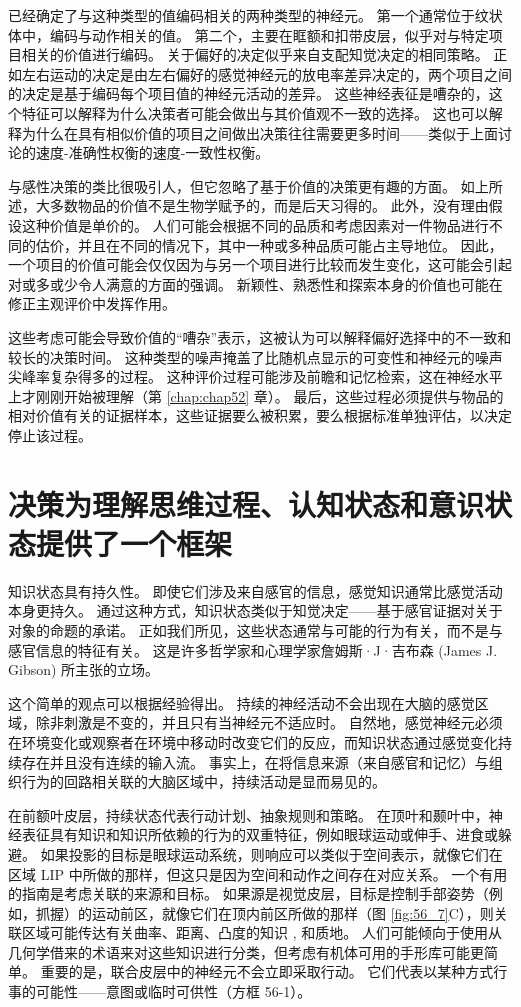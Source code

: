 已经确定了与这种类型的值编码相关的两种类型的神经元。 第一个通常位于纹状体中，编码与动作相关的值。 第二个，主要在眶额和扣带皮层，似乎对与特定项目相关的价值进行编码。 关于偏好的决定似乎来自支配知觉决定的相同策略。 正如左右运动的决定是由左右偏好的感觉神经元的放电率差异决定的，两个项目之间的决定是基于编码每个项目值的神经元活动的差异。 这些神经表征是嘈杂的，这个特征可以解释为什么决策者可能会做出与其价值观不一致的选择。 这也可以解释为什么在具有相似价值的项目之间做出决策往往需要更多时间——类似于上面讨论的速度-准确性权衡的速度-一致性权衡。

与感性决策的类比很吸引人，但它忽略了基于价值的决策更有趣的方面。 如上所述，大多数物品的价值不是生物学赋予的，而是后天习得的。 此外，没有理由假设这种价值是单价的。 人们可能会根据不同的品质和考虑因素对一件物品进行不同的估价，并且在不同的情况下，其中一种或多种品质可能占主导地位。 因此，一个项目的价值可能会仅仅因为与另一个项目进行比较而发生变化，这可能会引起对或多或少令人满意的方面的强调。 新颖性、熟悉性和探索本身的价值也可能在修正主观评价中发挥作用。

这些考虑可能会导致价值的“嘈杂”表示，这被认为可以解释偏好选择中的不一致和较长的决策时间。 这种类型的噪声掩盖了比随机点显示的可变性和神经元的噪声尖峰率复杂得多的过程。 这种评价过程可能涉及前瞻和记忆检索，这在神经水平上才刚刚开始被理解（第 \ref{chap:chap52} 章）。 最后，这些过程必须提供与物品的相对价值有关的证据样本，这些证据要么被积累，要么根据标准单独评估，以决定停止该过程。

\section{决策为理解思维过程、认知状态和意识状态提供了一个框架}
知识状态具有持久性。 即使它们涉及来自感官的信息，感觉知识通常比感觉活动本身更持久。 通过这种方式，知识状态类似于知觉决定——基于感官证据对关于对象的命题的承诺。 正如我们所见，这些状态通常与可能的行为有关，而不是与感官信息的特征有关。 这是许多哲学家和心理学家詹姆斯·J·吉布森 (James J. Gibson) 所主张的立场。

这个简单的观点可以根据经验得出。 持续的神经活动不会出现在大脑的感觉区域，除非刺激是不变的，并且只有当神经元不适应时。 自然地，感觉神经元必须在环境变化或观察者在环境中移动时改变它们的反应，而知识状态通过感觉变化持续存在并且没有连续的输入流。 事实上，在将信息来源（来自感官和记忆）与组织行为的回路相关联的大脑区域中，持续活动是显而易见的。

在前额叶皮层，持续状态代表行动计划、抽象规则和策略。 在顶叶和颞叶中，神经表征具有知识和知识所依赖的行为的双重特征，例如眼球运动或伸手、进食或躲避。 如果投影的目标是眼球运动系统，则响应可以类似于空间表示，就像它们在区域 LIP 中所做的那样，但这只是因为空间和动作之间存在对应关系。 一个有用的指南是考虑关联的来源和目标。 如果源是视觉皮层，目标是控制手部姿势（例如，抓握）的运动前区，就像它们在顶内前区所做的那样（图 \ref{fig:56_7}C），则关联区域可能传达有关曲率、距离、凸度的知识 , 和质地。 人们可能倾向于使用从几何学借来的术语来对这些知识进行分类，但考虑有机体可用的手形库可能更简单。 重要的是，联合皮层中的神经元不会立即采取行动。 它们代表以某种方式行事的可能性——意图或临时可供性（方框 56-1）。

